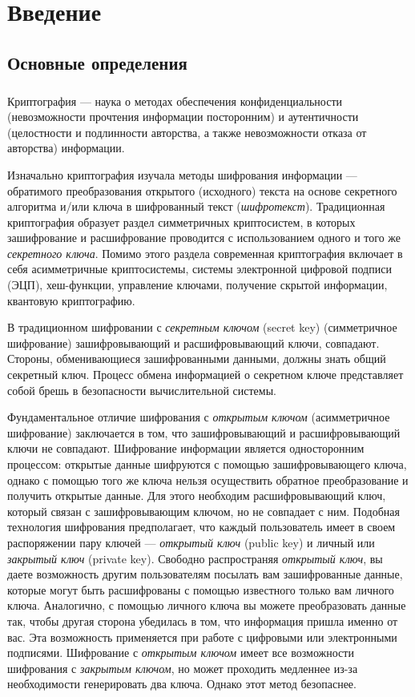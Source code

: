 \newpage
\chapter{Введение}

\section{Основные определения}

\paragraph{} Криптография — наука о методах обеспечения конфиденциальности (невозможности прочтения информации посторонним) и аутентичности (целостности и подлинности авторства, а также невозможности отказа от авторства) информации.

Изначально криптография изучала методы шифрования информации — обратимого преобразования открытого (исходного) текста на основе секретного алгоритма и/или ключа в шифрованный текст (\textit{шифротекст}). Традиционная криптография образует раздел симметричных криптосистем, в которых зашифрование и расшифрование проводится с использованием одного и того же \textit{секретного ключа}. Помимо этого раздела современная криптография включает в себя асимметричные криптосистемы, системы электронной цифровой подписи (ЭЦП), хеш-функции, управление ключами, получение скрытой информации, квантовую криптографию.

В традиционном шифровании с \textit{секретным ключом} (secret key) (симметричное шифрование) зашифровывающий и расшифровывающий ключи, совпадают. Стороны, обменивающиеся зашифрованными данными, должны знать общий секретный ключ. Процесс обмена информацией о секретном ключе представляет собой брешь в безопасности вычислительной системы.

Фундаментальное отличие шифрования с \textit{открытым ключом} (асимметричное шифрование) заключается в том, что зашифровывающий и расшифровывающий ключи не совпадают. Шифрование информации является односторонним процессом: открытые данные шифруются с помощью зашифровывающего ключа, однако с помощью того же ключа нельзя осуществить обратное преобразование и получить открытые данные. Для этого необходим расшифровывающий ключ, который связан с зашифровывающим ключом, но не совпадает с ним. Подобная технология шифрования предполагает, что каждый пользователь имеет в своем распоряжении пару ключей — \textit{открытый ключ} (public key) и личный или \textit{закрытый ключ} (private key). Свободно распространяя \textit{открытый ключ}, вы даете возможность другим пользователям посылать вам зашифрованные данные, которые могут быть расшифрованы с помощью известного только вам личного ключа. Аналогично, с помощью личного ключа вы можете преобразовать данные так, чтобы другая сторона убедилась в том, что информация пришла именно от вас. Эта возможность применяется при работе с цифровыми или электронными подписями. Шифрование с \textit{открытым ключом} имеет все возможности шифрования с \textit{закрытым ключом}, но может проходить медленнее из-за необходимости генерировать два ключа. Однако этот метод безопаснее.

